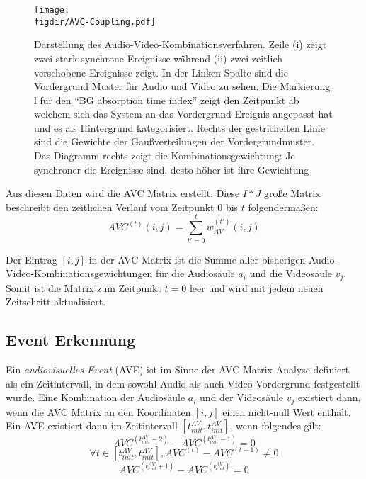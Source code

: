 \begin{figure}
\centering
\texttt{[image: \\figdir/AVC-Coupling.pdf]}
\caption{Darstellung des Audio-Video-Kombinationsverfahren. Zeile (i) zeigt zwei stark synchrone Ereignisse während (ii) zwei zeitlich verschobene Ereignisse zeigt. In der Linken Spalte sind die Vordergrund Muster für Audio und Video zu sehen. Die Markierung l für den ``BG absorption time index'' zeigt den Zeitpunkt ab welchem sich das System an das Vordergrund Ereignis angepasst hat und es als Hintergrund kategorisiert. Rechts der gestrichelten Linie sind die Gewichte der Gaußverteilungen der Vordergrundmuster. Das Diagramm rechts zeigt die Kombinationsgewichtung: Je synchroner die Ereignisse sind, desto höher ist ihre Gewichtung}
\label{FIG:AVC:Coupling}
\end{figure}

Aus diesen Daten wird die AVC Matrix erstellt. Diese $I * J$ große Matrix beschreibt den zeitlichen Verlauf vom Zeitpunkt 0 bis $t$ folgendermaßen:
\begin{equation}
AVC^{(t)}(i, j) = \sum\limits_{t'=0}^t w_{AV}^{(t')}(i,j)
\end{equation}

Der Eintrag $[i, j]$ in der AVC Matrix ist die Summe aller bisherigen Audio-Video-Kombinationsgewichtungen für die Audiosäule $a_i$ und die Videosäule $v_j$. Somit ist die Matrix zum Zeitpunkt $t = 0$ leer und wird mit jedem neuen Zeitschritt aktualisiert.

\subsection{Event Erkennung}

Ein \textit{audiovisuelles Event} (AVE) ist im Sinne der AVC Matrix Analyse definiert als ein Zeitintervall, in dem sowohl Audio als auch Video Vordergrund festgestellt wurde. Eine Kombination der Audiosäule $a_i$ und der Videosäule $v_j$ existiert dann, wenn die AVC Matrix an den Koordinaten $[i, j]$ einen nicht-null Wert enthält. Ein AVE existiert dann im Zeitintervall $[t_{init}^{AV}, t_{init}^{AV}]$, wenn folgendes gilt:
\begin{equation} \label{eq:no-pre-sync}
AVC^{(t_{init}^{AV} - 2)} - AVC^{(t_{init}^{AV} - 1)} = 0
\end{equation}
\begin{equation} \label{eq:event-sync}
\forall t \in [t_{init}^{AV}, t_{init}^{AV}], AVC^{(t)} - AVC^{(t + 1)} \neq 0
\end{equation}
\begin{equation} \label{eq:no-post-sync}
AVC^{(t_{end}^{AV} + 1)} - AVC^{(t_{end}^{AV})} = 0
\end{equation}

